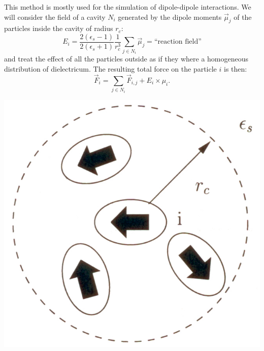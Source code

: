 \vspace{0.1cm}
\noindent
\begin{minipage}{\textwidth}
\begin{minipage}{.5\textwidth}
This method is mostly used for the simulation of dipole-dipole interactions. We will consider the field of a cavity $N_i$ generated by the dipole moments $\vec{\mu}_j$ of the particles inside the cavity of radius $r_c$:
\begin{equation}
E_i = \frac{2(\epsilon_s-1)}{2(\epsilon_s+1)}\frac{1}{r^3_c}\sum_{j\in N_i}{\vec{\mu}_j}= \text{``reaction field''}
\end{equation}
and treat the effect of all the particles outside as if they where a homogeneous distribution of dielectricum. The resulting total force on the particle $i$ is then:
\vspace{0.2cm}
\begin{equation}
\vec{F}_i = \sum_{j\in N_i}{\vec{F}_{i,j}+E_i\times\mu_i}.
\end{equation}
\end{minipage}\hfill
\begin{minipage}{.45\textwidth}
  \centering
  \includegraphics[width=\textwidth]{pics/reaction_field}
  \label{fig:reaction_field}
\end{minipage}
\end{minipage}
\vspace{0.1cm}




